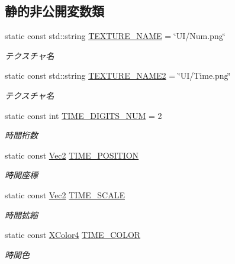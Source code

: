 \subsection*{静的非公開変数類}
\begin{DoxyCompactItemize}
\item 
static const std\+::string \mbox{\hyperlink{class_time_draw_aead8e68c07b9995faef2044a37fa2b59}{T\+E\+X\+T\+U\+R\+E\+\_\+\+N\+A\+ME}} = \char`\"{}UI/Num.\+png\char`\"{}
\begin{DoxyCompactList}\small\item\em テクスチャ名 \end{DoxyCompactList}\item 
static const std\+::string \mbox{\hyperlink{class_time_draw_a2f3552278dcc90a9301b1cfca7be0d4f}{T\+E\+X\+T\+U\+R\+E\+\_\+\+N\+A\+M\+E2}} = \char`\"{}UI/Time.\+png\char`\"{}
\begin{DoxyCompactList}\small\item\em テクスチャ名 \end{DoxyCompactList}\item 
static const int \mbox{\hyperlink{class_time_draw_a054b5ebf0f05c5fc80072491fac8d2f5}{T\+I\+M\+E\+\_\+\+D\+I\+G\+I\+T\+S\+\_\+\+N\+UM}} = 2
\begin{DoxyCompactList}\small\item\em 時間桁数 \end{DoxyCompactList}\item 
static const \mbox{\hyperlink{_vector3_d_8h_a5ef6e95dfc5f9d3820b71772d99bbc25}{Vec2}} \mbox{\hyperlink{class_time_draw_a72df1ddbe9ea6a326e2a4f2a950b0fe1}{T\+I\+M\+E\+\_\+\+P\+O\+S\+I\+T\+I\+ON}}
\begin{DoxyCompactList}\small\item\em 時間座標 \end{DoxyCompactList}\item 
static const \mbox{\hyperlink{_vector3_d_8h_a5ef6e95dfc5f9d3820b71772d99bbc25}{Vec2}} \mbox{\hyperlink{class_time_draw_a2cc7a69141e165fb397b5e06caf7828e}{T\+I\+M\+E\+\_\+\+S\+C\+A\+LE}}
\begin{DoxyCompactList}\small\item\em 時間拡縮 \end{DoxyCompactList}\item 
static const \mbox{\hyperlink{_vector3_d_8h_a680c30c4a07d86fe763c7e01169cd6cc}{X\+Color4}} \mbox{\hyperlink{class_time_draw_a0c039a965f7340093780e72cbf79ddc0}{T\+I\+M\+E\+\_\+\+C\+O\+L\+OR}}
\begin{DoxyCompactList}\small\item\em 時間色 \end{DoxyCompactList}\end{DoxyCompactItemize}


